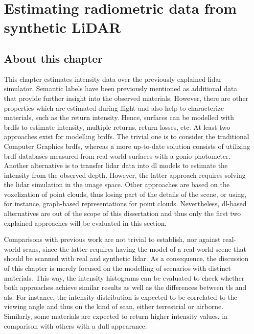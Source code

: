 \setchapterpreamble[u]{\margintoc}
\chapter{Estimating radiometric data from synthetic LiDAR}
\label{sec:lidar_intensity}

\section*{About this chapter}

This chapter estimates intensity data over the previously explained \acrshort{lidar} simulator. Semantic labels have been previously mentioned as additional data that provide further insight into the observed materials. However, there are other properties which are estimated during flight and also help to characterize materials, such as the return intensity. Hence, surfaces can be modelled with \acrshort{brdf}s to estimate intensity, multiple returns, return losses, etc. At least two approaches exist for modelling \acrshort{brdf}s. The trivial one is to consider the traditional Computer Graphics \acrshort{brdf}s, whereas a more up-to-date solution consists of utilizing \acrshort{brdf} databases measured from real-world surfaces with a gonio-photometer. Another alternative is to transfer \acrshort{lidar} data into \acrshort{dl} models to estimate the intensity from the observed depth. However, the latter approach requires solving the \acrshort{lidar} simulation in the image space. Other approaches are based on the voxelization of point clouds, thus losing part of the details of the scene, or using, for instance, graph-based representations for point clouds. Nevertheless, \acrshort{dl}-based alternatives are out of the scope of this dissertation and thus only the first two explained approaches will be evaluated in this section.

Comparisons with previous work are not trivial to establish, nor against real-world scans, since the latter requires having the model of a real-world scene that should be scanned with real and synthetic \acrshort{lidar}. As a consequence, the discussion of this chapter is merely focused on the modelling of scenarios with distinct materials. This way, the intensity histograms can be evaluated to check whether both approaches achieve similar results as well as the differences between \acrshort{tls} and \acrshort{als}. For instance, the intensity distribution is expected to be correlated to the viewing angle and thus on the kind of scan, either terrestrial or airborne. Similarly, some materials are expected to return higher intensity values, in comparison with others with a dull appearance.

